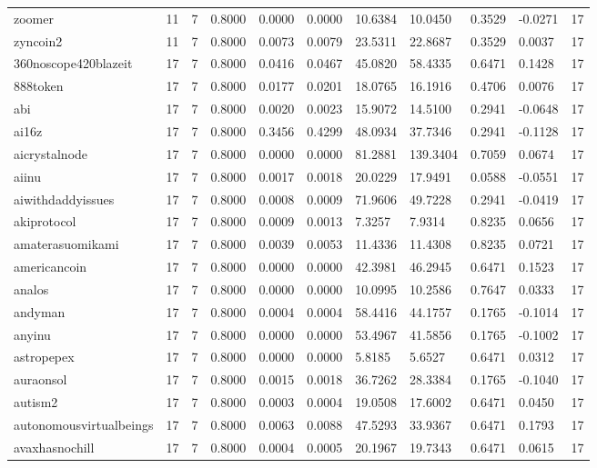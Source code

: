 \begin{table}[htbp]
\begin{tabular}{lllllllllll}
zoomer & 11 & 7 & 0.8000 & 0.0000 & 0.0000 & 10.6384 & 10.0450 & 0.3529 & -0.0271 & 17 \\
zyncoin2 & 11 & 7 & 0.8000 & 0.0073 & 0.0079 & 23.5311 & 22.8687 & 0.3529 & 0.0037 & 17 \\
360noscope420blazeit & 17 & 7 & 0.8000 & 0.0416 & 0.0467 & 45.0820 & 58.4335 & 0.6471 & 0.1428 & 17 \\
888token & 17 & 7 & 0.8000 & 0.0177 & 0.0201 & 18.0765 & 16.1916 & 0.4706 & 0.0076 & 17 \\
abi & 17 & 7 & 0.8000 & 0.0020 & 0.0023 & 15.9072 & 14.5100 & 0.2941 & -0.0648 & 17 \\
ai16z & 17 & 7 & 0.8000 & 0.3456 & 0.4299 & 48.0934 & 37.7346 & 0.2941 & -0.1128 & 17 \\
aicrystalnode & 17 & 7 & 0.8000 & 0.0000 & 0.0000 & 81.2881 & 139.3404 & 0.7059 & 0.0674 & 17 \\
aiinu & 17 & 7 & 0.8000 & 0.0017 & 0.0018 & 20.0229 & 17.9491 & 0.0588 & -0.0551 & 17 \\
aiwithdaddyissues & 17 & 7 & 0.8000 & 0.0008 & 0.0009 & 71.9606 & 49.7228 & 0.2941 & -0.0419 & 17 \\
akiprotocol & 17 & 7 & 0.8000 & 0.0009 & 0.0013 & 7.3257 & 7.9314 & 0.8235 & 0.0656 & 17 \\
amaterasuomikami & 17 & 7 & 0.8000 & 0.0039 & 0.0053 & 11.4336 & 11.4308 & 0.8235 & 0.0721 & 17 \\
americancoin & 17 & 7 & 0.8000 & 0.0000 & 0.0000 & 42.3981 & 46.2945 & 0.6471 & 0.1523 & 17 \\
analos & 17 & 7 & 0.8000 & 0.0000 & 0.0000 & 10.0995 & 10.2586 & 0.7647 & 0.0333 & 17 \\
andyman & 17 & 7 & 0.8000 & 0.0004 & 0.0004 & 58.4416 & 44.1757 & 0.1765 & -0.1014 & 17 \\
anyinu & 17 & 7 & 0.8000 & 0.0000 & 0.0000 & 53.4967 & 41.5856 & 0.1765 & -0.1002 & 17 \\
astropepex & 17 & 7 & 0.8000 & 0.0000 & 0.0000 & 5.8185 & 5.6527 & 0.6471 & 0.0312 & 17 \\
auraonsol & 17 & 7 & 0.8000 & 0.0015 & 0.0018 & 36.7262 & 28.3384 & 0.1765 & -0.1040 & 17 \\
autism2 & 17 & 7 & 0.8000 & 0.0003 & 0.0004 & 19.0508 & 17.6002 & 0.6471 & 0.0450 & 17 \\
autonomousvirtualbeings & 17 & 7 & 0.8000 & 0.0063 & 0.0088 & 47.5293 & 33.9367 & 0.6471 & 0.1793 & 17 \\
avaxhasnochill & 17 & 7 & 0.8000 & 0.0004 & 0.0005 & 20.1967 & 19.7343 & 0.6471 & 0.0615 & 17 \\

\end{tabular}
\end{table}

